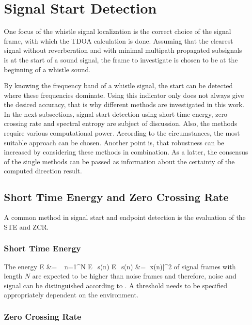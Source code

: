 \section{Signal Start Detection}
\label{sec:02_signalStartDetection}

One focus of the whistle signal localization is the correct choice of the
signal frame, with which the \ac{TDOA} calculation is done.
Assuming that the clearest signal without reverberation and with minimal
multipath propagated subsignals is at the start of a sound signal,
the frame to investigate is chosen to be at the beginning of a whistle sound.

By knowing the frequency band of a whistle signal, the start can be detected
where these frequencies dominate.
Using this indicator only does not always give the desired accuracy, that is why
different methods are investigated in this work.
In the next subsections, signal start detection using short time energy,
zero crossing rate and spectral entropy are subject of discussion.
Also, the methods require
various computational power. According to the circumstances, the most suitable
approach can be chosen.
Another point is, that robustness can be increased by considering these methods
in combination.
As a latter, the consensus of the single methods can be passed as information
about the certainty of the computed direction result.

\subsection{Short Time Energy and Zero Crossing Rate}

A common method in signal start and endpoint detection is the evaluation
of the \ac{STE} and \ac{ZCR}.

\subsubsection{Short Time Energy}
The energy
\bal
    E &= \sum_{n=1}^N E_s(n)
    \label{eq:02_energy}
    E_s(n) &= |x(n)|^2
    \label{eq:02_spectralEnergy}
\eal
of signal frames with length $N$ are expected to be higher than noise frames
and therefore, noise and signal can be distinguished
according to \cite{Z_W_voiceActivity}.
A threshold needs to be specified appropriately dependent on the environment.

\subsubsection{Zero Crossing Rate}

